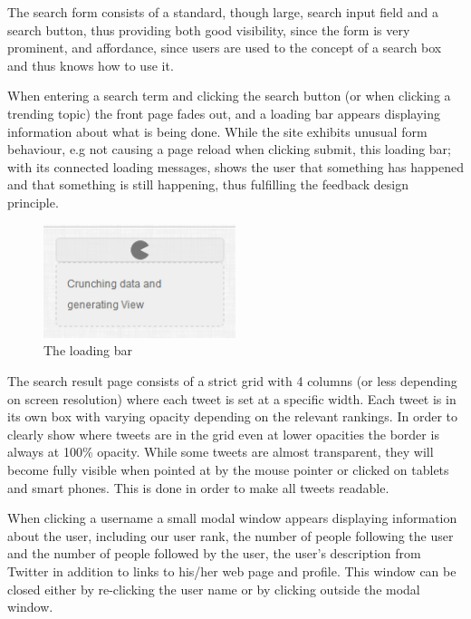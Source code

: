 The search form consists of a standard, though large, search input field and a search button, thus providing both good visibility, since the form is very prominent, and affordance, since users are used to the concept of a search box and thus knows how to use it.

When entering a search term and clicking the search button (or when clicking a trending topic) the front page fades out, and a loading bar appears displaying information about what is being done. While the site exhibits unusual form behaviour, e.g not causing a page reload when clicking submit, this loading bar; with its connected loading messages, shows the user that something has happened and that something is still happening, thus fulfilling the feedback design principle.

\begin{figure}[ht]
    \begin{minipage}[b]{1\linewidth}
        \centering
        \includegraphics[width=0.5\textwidth]{figures/feedjam_loading}
        \caption{The loading bar}
        \label{fig:FeedJamLoading}
    \end{minipage}
\end{figure}


The search result page consists of a strict grid with 4 columns (or less depending on screen resolution) where each tweet is set at a specific width. Each tweet is in its own box with varying opacity depending on the relevant rankings. In order to clearly show where tweets are in the grid even at lower opacities the border is always at 100\% opacity. While some tweets are almost transparent, they will become fully visible when pointed at by the mouse pointer or clicked on tablets and smart phones. This is done in order to make all tweets readable.

When clicking a username a small modal window appears displaying information about the user, including our user rank, the number of people following the user and the number of people followed by the user, the user's description from Twitter in addition to links to his/her web page and profile. This window can be closed either by re-clicking the user name or by clicking outside the modal window.

